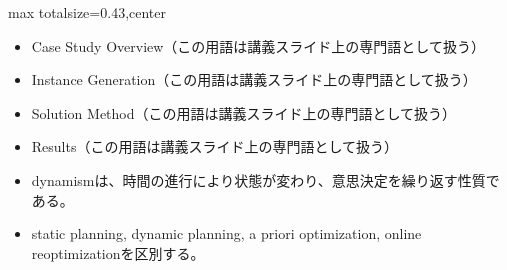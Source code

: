 \clearpage
{}
\begin{minipage}[t]{0.405\textwidth}
\begin{adjustbox}{max totalsize={\textwidth}{0.43\textheight},center}
\begin{minipage}{\textwidth}\scriptsize
{}\begin{itemize}
\item Case Study Overview（この用語は講義スライド上の専門語として扱う）
\item Instance Generation（この用語は講義スライド上の専門語として扱う）
\item Solution Method（この用語は講義スライド上の専門語として扱う）
\item Results（この用語は講義スライド上の専門語として扱う）
\end{itemize}\begin{itemize}
\item dynamismは、時間の進行により状態が変わり、意思決定を繰り返す性質である。
\item static planning, dynamic planning, a priori optimization, online reoptimizationを区別する。
\end{itemize}
\end{minipage}
\end{adjustbox}
\end{minipage}\hfill
